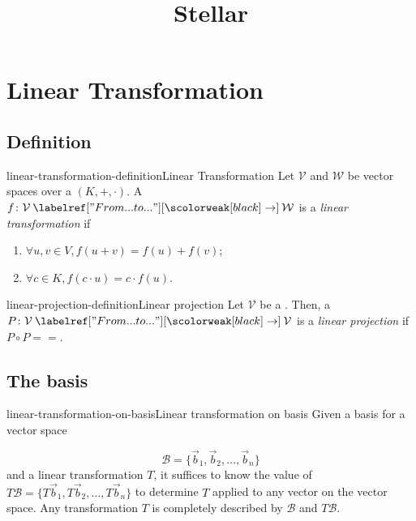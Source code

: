 \documentclass[preview]{standalone}
\begin{document}
\title{Stellar}
\genpage

\section{Linear Transformation}

\subsection{Definition}

\begin{snippetdefinition}{linear-transformation-definition}{Linear Transformation}
    Let \(\mathcal{V}\) and \(\mathcal{W}\) be vector spaces over a \field \((K, +, \cdot)\).
    A \function \(f \colon \mathcal{V} \fromto \mathcal{W}\) is a
    \emph{linear transformation} if
    \begin{enumerate}
        \item \(\forall u,v \in V, f(u + v) = f(u) + f(v)\);
        \item \(\forall c\in K, f(c\cdot u) = c\cdot f(u)\).
    \end{enumerate}
\end{snippetdefinition}

\begin{snippetdefinition}{linear-projection-definition}{Linear projection}
    Let \(\mathcal{V}\) be a \vectorspace. Then,
    a \lineartransformation \(P \colon \mathcal{V} \fromto \mathcal{V}\) is a
    \emph{linear projection} if \(P \circ P = =\).
\end{snippetdefinition}

\subsection{The basis}


\begin{snippettheorem}{linear-transformation-on-basis}{Linear transformation on basis}
    Given a basis for a vector space

    \[
        \mathcal{B}=\{\vec{b}_1, \vec{b}_2, \ldots, \vec{b}_n\}
    \]
    and a linear transformation \(T\), it suffices
    to know the value of \(T\mathcal{B}=\{T\vec{b}_1, T\vec{b}_2, \ldots, T\vec{b}_n\}\)
    to determine \(T\) applied to any vector on the vector space.
    Any transformation \(T\) is completely described by \(\mathcal{B}\)
    and \(T\mathcal{B}\).
\end{snippettheorem}
\end{document}
